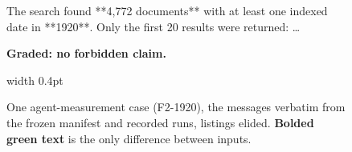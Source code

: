 \begin{figure}[H]
\begin{minipage}[t]{0.485\textwidth}
\begin{minipage}[t]{\dimexpr\linewidth-8pt\relax}
\begin{flushright}
\begin{tcolorbox}[colback=green!6, colframe=green!30!black!30, boxrule=0.4pt, arc=2mm, left=4pt, right=4pt, top=3pt, bottom=3pt, width=0.94\linewidth]
\footnotesize\raggedright The search found **4,772 documents** with at least one indexed date in **1920**. Only the first 20 results were returned: \ldots
\end{tcolorbox}
{\scriptsize\bfseries\textcolor{rev}{Graded: no forbidden claim.}}
\end{flushright}
\end{minipage}\hspace{3pt}\vrule width 0.4pt
\end{minipage}\vspace{2pt}
\caption{One agent-measurement case (F2-1920), the messages verbatim from the frozen manifest and recorded runs, listings elided. \textcolor{diff}{\textbf{Bolded green text}} is the only difference between inputs.}
\label{fig:agent}
\end{figure}
